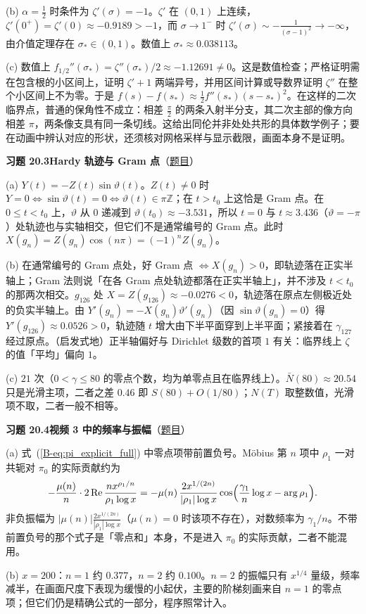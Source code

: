 \documentclass[11pt,a4paper]{article}
\renewcommand{\Re}{\operatorname{Re}}
\newcommand{\bref}[1]{\ref*{B-#1}}
\newcommand{\Sol}[2]{%
  \par\addvspace{1.2em}\noindent
  \hypertarget{s:#1}{}\textbf{习题 #1\quad #2}\hfill{\small（\hyperlink{q:#1}{题目}）}\par
  \nopagebreak\smallskip}
\begin{document}
(b) $\alpha=\frac12$ 时条件为 $\zeta'(\sigma)=-1$。$\zeta'$ 在 $(0,1)$ 上连续，$\zeta'(0^+)=\zeta'(0)\approx-0.9189>-1$，而 $\sigma\to1^-$ 时 $\zeta'(\sigma)\sim-\frac1{(\sigma-1)^2}\to-\infty$，由介值定理存在 $\sigma_*\in(0,1)$。数值上 $\sigma_*\approx0.038113$。

(c) 数值上 $f_{1/2}''(\sigma_*)=\zeta''(\sigma_*)/2\approx-1.12691\ne0$。这是数值检查；严格证明需在包含根的小区间上，证明 $\zeta'+1$ 两端异号，并用区间计算或导数界证明 $\zeta''$ 在整个小区间上不为零。于是 $f(s)-f(s_*)\approx\frac12f''(s_*)(s-s_*)^2$。在这样的二次临界点，普通的保角性不成立：相差 $\frac\pi2$ 的两条入射半分支，其二次主部的像方向相差 $\pi$，两条像支具有同一条切线。这给出同伦并非处处共形的具体数学例子；要在动画中辨认对应的形状，还须核对网格采样与显示截限，画面本身不是证明。

\Sol{20.3}{Hardy 轨迹与 Gram 点}
(a) $Y(t)=-Z(t)\sin\vartheta(t)$。$Z(t)\neq0$ 时 $Y=0\iff\sin\vartheta(t)=0\iff\vartheta(t)\in\pi\mathbb Z$；在 $t>t_0$ 上这恰是 Gram 点。在 $0\le t<t_0$ 上，$\vartheta$ 从 $0$ 递减到 $\vartheta(t_0)\approx-3.531$，所以 $t=0$ 与 $t\approx3.436$（$\vartheta=-\pi$）处轨迹也与实轴相交，但它们不是通常编号的 Gram 点。此时 $X(g_n)=Z(g_n)\cos(n\pi)=(-1)^nZ(g_n)$。

(b) 在通常编号的 Gram 点处，好 Gram 点 $\iff X(g_n)>0$，即轨迹落在正实半轴上；Gram 法则说「在各 Gram 点处轨迹都落在正实半轴上」，并不涉及 $t<t_0$ 的那两次相交。$g_{126}$ 处 $X=Z(g_{126})\approx-0.0276<0$，轨迹落在原点左侧极近处的负实半轴上。由 $Y'(g_n)=-X(g_n)\vartheta'(g_n)$（因 $\sin\vartheta(g_n)=0$）得 $Y'(g_{126})\approx0.0526>0$，轨迹随 $t$ 增大由下半平面穿到上半平面；紧接着在 $\gamma_{127}$ 经过原点。（启发式地）正半轴偏好与 Dirichlet 级数的首项 $1$ 有关：临界线上 $\zeta$ 的值「平均」偏向 $1$。

(c) $21$ 次（$0<\gamma\le80$ 的零点个数，均为单零点且在临界线上）。$\bar N(80)\approx20.54$ 只是光滑主项，二者之差 $0.46$ 即 $S(80)+O(1/80)$；$N(T)$ 取整数值，光滑项不取，二者一般不相等。

\Sol{20.4}{视频 3 中的频率与振幅}
(a) 式~(\bref{eq:pi_explicit_full}) 中零点项带前置负号。Möbius 第 $n$ 项中 $\rho_1$ 一对共轭对 $\pi_0$ 的实际贡献约为
\[
  -\frac{\mu(n)}n\cdot2\Re\frac{nx^{\rho_1/n}}{\rho_1\log x}=-\mu(n)\,\frac{2x^{1/(2n)}}{|\rho_1|\log x}\cos\Bigl(\frac{\gamma_1}n\log x-\arg\rho_1\Bigr).
\]
非负振幅为 $|\mu(n)|\frac{2x^{1/(2n)}}{|\rho_1|\log x}$（$\mu(n)=0$ 时该项不存在），对数频率为 $\gamma_1/n$。不带前置负号的那个式子是「零点和」本身，不是进入 $\pi_0$ 的实际贡献，二者不能混用。

(b) $x=200$：$n=1$ 约 $0.377$，$n=2$ 约 $0.100$。$n=2$ 的振幅只有 $x^{1/4}$ 量级，频率减半，在画面尺度下表现为缓慢的小起伏，主要的阶梯刻画来自 $n=1$ 的零点项；但它们仍是精确公式的一部分，程序照常计入。
\end{document}
